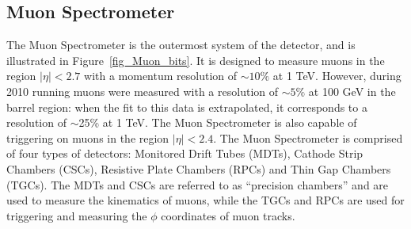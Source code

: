 


%
%
%
%
%
%
%
%
%
%
%
%
%
%




%
%
%
%
%
%
%



\subsection{Muon Spectrometer}

The Muon Spectrometer is the outermost system of the \atlas detector, and is illustrated in Figure~\ref{fig_Muon_bits}. It is designed to measure muons in the region $|\eta| < 2.7$ with a momentum resolution of $\sim 10\%$ at 1 TeV. However, during 2010 running muons were measured with a resolution of $\sim 5\%$ at 100 GeV in the barrel region\cite{muon_bs}: when the fit to this data is extrapolated, it corresponds to a resolution of $\sim$25\% at 1 TeV. The Muon Spectrometer is also capable of triggering on muons in the region $|\eta| <2.4$. The Muon Spectrometer is comprised of four types of detectors: Monitored Drift Tubes (MDTs), Cathode Strip Chambers (CSCs), Resistive Plate Chambers (RPCs) and Thin Gap Chambers (TGCs). The MDTs and CSCs are referred to as ``precision chambers'' and are used to measure the kinematics of muons, while the TGCs and RPCs are used for triggering and measuring the $\phi$ coordinates of muon tracks.

